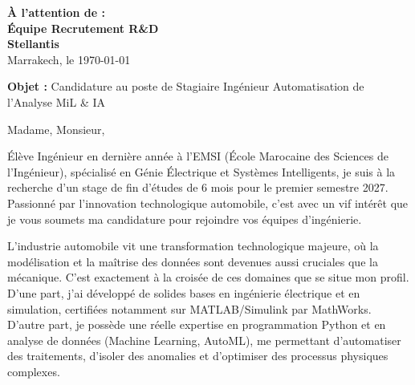 \documentclass[10pt,a4paper]{altacv}
\makeatletter
\renewcommand{\makecvheader}{%
  \begingroup
    \raggedright\color{emphasis}%
    {\Huge\bfseries\MakeUppercase{\@name}\par}
    \medskip
    {\large\bfseries\color{accent}\@tagline\par}
    \medskip
    {\footnotesize\bfseries\@personalinfo\par}
  \endgroup\medskip
}
\makeatother
\begin{document}

\makecvheader

\bigskip

\begin{flushright}
  {\color{emphasis}\textbf{À l'attention de :}} \\[2pt]
  \textbf{Équipe Recrutement R\&D} \\
  \textbf{Stellantis} \\[20pt]
  Marrakech, le \today
\end{flushright}
\bigskip

\bigskip

{\color{accent}\textbf{Objet :}} Candidature au poste de Stagiaire Ingénieur Automatisation de l'Analyse MiL \& IA

\bigskip\bigskip

Madame, Monsieur,

\vspace{0.4cm}

Élève Ingénieur en dernière année à l'EMSI (École Marocaine des Sciences de l'Ingénieur), spécialisé en Génie Électrique et Systèmes Intelligents, je suis à la recherche d'un stage de fin d'études de 6 mois pour le premier semestre 2027. Passionné par l'innovation technologique automobile, c'est avec un vif intérêt que je vous soumets ma candidature pour rejoindre vos équipes d'ingénierie.

\vspace{0.4cm}

L'industrie automobile vit une transformation technologique majeure, où la modélisation et la maîtrise des données sont devenues aussi cruciales que la mécanique. C'est exactement à la croisée de ces domaines que se situe mon profil. D'une part, j'ai développé de solides bases en ingénierie électrique et en simulation, certifiées notamment sur MATLAB/Simulink par MathWorks. D'autre part, je possède une réelle expertise en programmation Python et en analyse de données (Machine Learning, AutoML), me permettant d'automatiser des traitements, d'isoler des anomalies et d'optimiser des processus physiques complexes.
\end{document}
